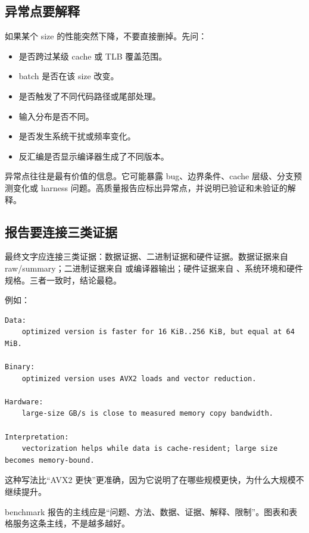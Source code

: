 \subsection{异常点要解释}

如果某个 size 的性能突然下降，不要直接删掉。先问：

\begin{itemize}
  \item 是否跨过某级 cache 或 TLB 覆盖范围。
  \item batch 是否在该 size 改变。
  \item 是否触发了不同代码路径或尾部处理。
  \item 输入分布是否不同。
  \item 是否发生系统干扰或频率变化。
  \item 反汇编是否显示编译器生成了不同版本。
\end{itemize}

异常点往往是最有价值的信息。它可能暴露 bug、边界条件、cache 层级、分支预测变化或 harness 问题。高质量报告应标出异常点，并说明已验证和未验证的解释。

\subsection{报告要连接三类证据}

最终文字应连接三类证据：数据证据、二进制证据和硬件证据。数据证据来自 raw/summary；二进制证据来自  或编译器输出；硬件证据来自 、系统环境和硬件规格。三者一致时，结论最稳。

例如：

\begin{lstlisting}
Data:
    optimized version is faster for 16 KiB..256 KiB, but equal at 64 MiB.

Binary:
    optimized version uses AVX2 loads and vector reduction.

Hardware:
    large-size GB/s is close to measured memory copy bandwidth.

Interpretation:
    vectorization helps while data is cache-resident; large size becomes memory-bound.
\end{lstlisting}

这种写法比“AVX2 更快”更准确，因为它说明了在哪些规模更快，为什么大规模不继续提升。

\begin{keyidea}
benchmark 报告的主线应是“问题、方法、数据、证据、解释、限制”。图表和表格服务这条主线，不是越多越好。
\end{keyidea}

